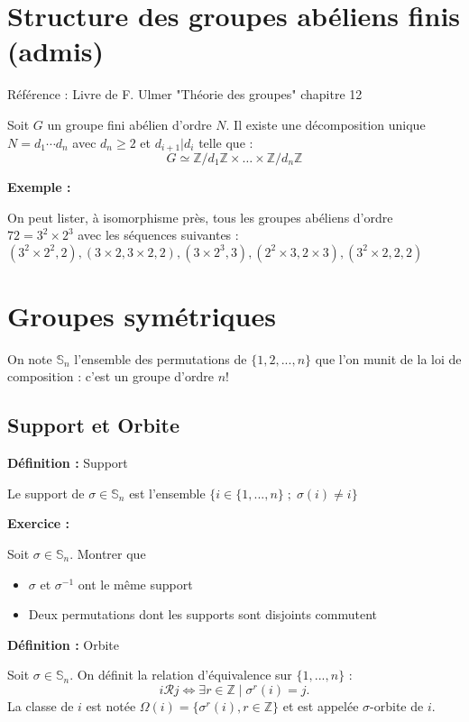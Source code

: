 \documentclass{report}
\newenvironment{definition}[1][]{
    \begin{tcolorbox}[colframe= white]
    \textbf{Définition :} 
    #1 \par
    }
    {\end{tcolorbox}}
\newenvironment{exemple}{\begin{tcolorbox}[colback=gray!10,colframe= white]
    \textbf{Exemple :}
     \par}
    {\end{tcolorbox}}
\newenvironment{exo}{\begin{tcolorbox}[colframe= white]
    \textbf{Exercice :}
    \par}
    {\end{tcolorbox}}
\newcommand{\Z}{\mathbb{Z}}
\newcommand{\sn}{\mathbb{S}_n}
\newcommand{\unn}{\{1, ..., n\}}
\begin{document}
\section{Structure des groupes abéliens finis (admis)}
Référence : Livre de F. Ulmer "Théorie des groupes" chapitre 12


Soit $G$ un groupe fini abélien d'ordre $N$. Il existe une décomposition unique $N=d_1 \cdots d_n$ avec $d_n \geq 2$ et $d_{i+1} | d_i$ telle que : $$G \simeq \mathbb{Z}/d_1\mathbb{Z} \times \dots \times \mathbb{Z}/d_n\mathbb{Z}$$

\begin{exemple}
	On peut lister, à isomorphisme près, tous les groupes abéliens d'ordre $72=3^2 \times 2^3$ avec les séquences suivantes : $(3^2 \times 2^2, 2) , (3\times 2, 3\times 2, 2), (3\times 2^3, 3), (2^2\times 3, 2\times 3), (3^2\times 2,2,2)$
\end{exemple}

\section{Groupes symétriques}
On note $\sn$  l'ensemble des permutations de $\{1, 2, ..., n\}$ que l'on munit de la loi de composition : c'est un groupe d'ordre $n!$

\subsection{Support et Orbite}
\begin{definition}[Support]
Le support de $\sigma \in \sn$ est l'ensemble $\{i\in\unn\; ; \; \sigma(i)\neq i\}$
\end{definition}

\begin{exo}
Soit $\sigma\in\sn$. Montrer que
\begin{itemize}[label=$\bullet$]
\item $\sigma$ et $\sigma^{-1}$ ont le même support
\item Deux permutations dont les supports sont disjoints commutent
\end{itemize}
\end{exo}

\begin{definition}[Orbite]
Soit $\sigma\in\sn$. On définit la relation d'équivalence sur $\unn$ : \[i\mathcal{R}j \Longleftrightarrow \exists r\in\Z \;|\;\sigma^r(i)=j.\]
La classe de $i$ est notée $\Omega(i) = \{\sigma^r(i), r\in\Z\}$ et est appelée $\sigma$-orbite de $i$.
\end{definition}
\end{document}
